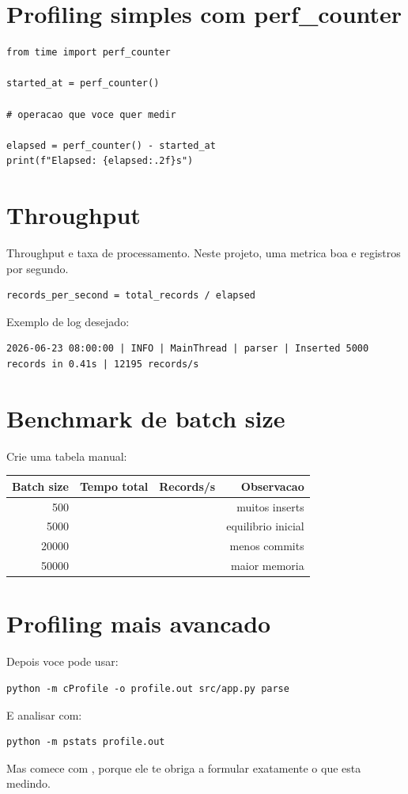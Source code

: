 \section{Profiling simples com perf\_counter}

\begin{lstlisting}[style=devbutterpython]
from time import perf_counter

started_at = perf_counter()

# operacao que voce quer medir

elapsed = perf_counter() - started_at
print(f"Elapsed: {elapsed:.2f}s")
\end{lstlisting}

\section{Throughput}

Throughput e taxa de processamento. Neste projeto, uma metrica boa e registros por segundo.

\begin{lstlisting}[style=devbutterpython]
records_per_second = total_records / elapsed
\end{lstlisting}

Exemplo de log desejado:

\begin{verbatim}
2026-06-23 08:00:00 | INFO | MainThread | parser | Inserted 5000 records in 0.41s | 12195 records/s
\end{verbatim}

\section{Benchmark de batch size}

Crie uma tabela manual:

\begin{longtable}{rrrr}
\toprule
\textbf{Batch size} & \textbf{Tempo total} & \textbf{Records/s} & \textbf{Observacao} \\
\midrule
500 & & & muitos inserts \\
5000 & & & equilibrio inicial \\
20000 & & & menos commits \\
50000 & & & maior memoria \\
\bottomrule
\end{longtable}

\section{Profiling mais avancado}

Depois voce pode usar:

\begin{lstlisting}[style=devbutterbash]
python -m cProfile -o profile.out src/app.py parse
\end{lstlisting}

E analisar com:

\begin{lstlisting}[style=devbutterbash]
python -m pstats profile.out
\end{lstlisting}

Mas comece com , porque ele te obriga a formular exatamente o que esta medindo.
